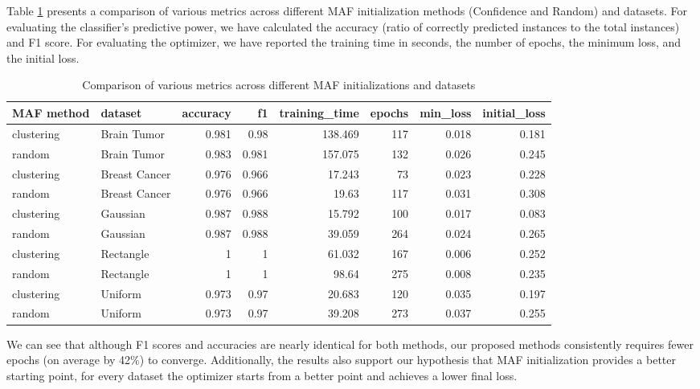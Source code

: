 \documentclass[10pt,a4paper,oneside]{article}
\begin{document}
Table \ref{comparison} presents a comparison of various metrics across different MAF initialization methods (Confidence and Random) and datasets. For evaluating the classifier's predictive power, we have calculated the accuracy (ratio of correctly predicted instances to the total instances) and F1 score. For evaluating the optimizer, we have reported the training time in seconds, the number of epochs, the minimum loss, and the initial loss.

\begin{table}[H]
    \centering
    \caption{Comparison of various metrics across different MAF initializations and datasets}
    \label{comparison}
    \begin{tabular}{l|l|r|r|r|r|r|r}
    \toprule
    MAF method & dataset & accuracy & f1 & training\_time & epochs & min\_loss & initial\_loss\\
    \midrule
    clustering & Brain Tumor & 0.981 & 0.98 & 138.469 & 117 & 0.018 & 0.181 \\
    random & Brain Tumor & 0.983 & 0.981 & 157.075 & 132 & 0.026 & 0.245 \\
    clustering & Breast Cancer & 0.976 & 0.966 & 17.243 & 73 & 0.023 & 0.228 \\
    random & Breast Cancer & 0.976 & 0.966 & 19.63 & 117 & 0.031 & 0.308 \\
    clustering & Gaussian & 0.987 & 0.988 & 15.792 & 100 & 0.017 & 0.083 \\
    random & Gaussian & 0.987 & 0.988 & 39.059 & 264 & 0.024 & 0.265 \\
    clustering & Rectangle & 1 & 1 & 61.032 & 167 & 0.006 & 0.252  \\
    random & Rectangle & 1 & 1 & 98.64 & 275 & 0.008 & 0.235 \\
    clustering & Uniform & 0.973 & 0.97 & 20.683 & 120 & 0.035 & 0.197  \\
    random & Uniform & 0.973 & 0.97 & 39.208 & 273 & 0.037 & 0.255 \\
        \bottomrule
    \end{tabular}
\end{table}

{\color{red}We can see that although F1 scores and accuracies are nearly identical for both methods, our proposed methods consistently requires fewer epochs (on average by 42$\%$) to converge. Additionally, the results also support our hypothesis that MAF initialization provides a better starting point, for every dataset the optimizer starts from a better point and achieves a lower final loss.}
\end{document}
